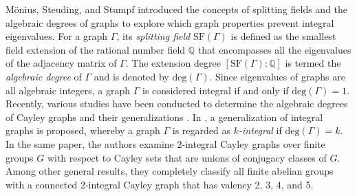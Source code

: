 \documentclass{amsart}
\def \leq {\leqslant}
\def \geq {\geqslant}
\def\Cay{{\sf Cay}} \def\Ker{{\sf Ker}}
\begin{document}


M\"{o}nius, Steuding, and Stumpf \cite{MSS} introduced the concepts of splitting fields and the algebraic degrees of graphs to explore which graph properties prevent integral eigenvalues. For a graph \( \Gamma \), its \textit{splitting field} \( \text{SF}(\Gamma) \) is defined as the smallest field extension of the rational number field \( \mathbb{Q} \) that encompasses all the eigenvalues of the adjacency matrix of \( \Gamma \). The extension degree \( [\text{SF}(\Gamma) : \mathbb{Q}] \) is termed the \textit{algebraic degree} of \( \Gamma \) and is denoted by \( \text{deg}(\Gamma) \). Since eigenvalues of graphs are all algebraic integers, a graph \( \Gamma \) is considered integral if and only if \( \text{deg}(\Gamma) = 1 \). Recently, various studies have been conducted to determine the algebraic degrees of Cayley graphs and their generalizations \cite{HLM,LM,SM,WAF,WYF}. In \cite{AAFW}, a generalization of integral graphs is proposed, whereby a graph \( \Gamma \) is regarded as \textit{\( k \)-integral} if \( \text{deg}(\Gamma) = k \). In the same paper, the authors examine \( 2 \)-integral Cayley graphs over finite groups \( G \) with respect to Cayley sets that are unions of conjugacy classes of \( G \). Among other general results, they completely classify all finite abelian groups with a connected \( 2 \)-integral Cayley graph that has valency 2, 3, 4, and 5.
\end{document}
